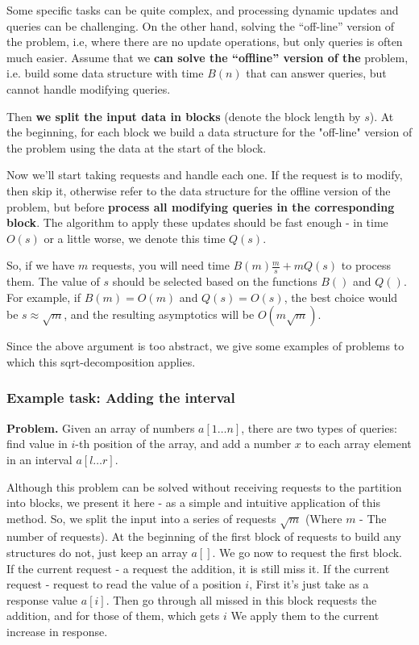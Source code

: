 Some specific tasks can be quite complex, and processing dynamic updates and queries can be challenging. On the other hand, solving the ``off-line'' version of the problem, i.e, where there are no update operations, but only queries is often much easier. Assume that we \textbf{can solve the ``offline'' version of the} problem, i.e. build some data structure with time $B(n)$ that can answer queries, but cannot handle modifying queries.

Then \textbf{we split the input data in blocks} (denote the block length by $s$). At the beginning, for each block we build a data structure for the "off-line" version of the problem using the data at the start of the block.

Now we'll start taking requests and handle each one. If the request is to modify, then skip it, otherwise refer to the data structure for the offline version of the problem, but before \textbf{process all modifying queries in the corresponding block}. The algorithm to apply these updates should be fast enough - in time $O (s)$ or a little worse, we denote this time $Q (s)$.

So, if we have $m$ requests, you will need time $B (m) \frac {m} {s} + m Q (s)$ to process them. The value of $s$ should be selected based on the functions $B()$ and $Q()$. For example, if $B (m) = O (m)$ and $Q (s) = O (s)$, the best choice would be $s \approx \sqrt {m}$, and the resulting asymptotics will be $O (m \sqrt {m})$.

Since the above argument is too abstract, we give some examples of problems to which this sqrt-decomposition applies.

\subsubsection{ Example task: Adding the interval }

\textbf{Problem. } Given an array of numbers $a [1 \ldots n]$, there are two types of queries: find value in $i$-th position of the array, and add a number $x$ to each array element in an interval $a [l \dots r]$.

Although this problem can be solved without receiving requests to the partition into blocks, we present it here - as a simple and intuitive application of this method.
So, we split the input into a series of requests $\sqrt {m}$ (Where $m$ - The number of requests). At the beginning of the first block of requests to build any structures do not, just keep an array $a []$. We go now to request the first block. If the current request - a request the addition, it is still miss it. If the current request - request to read the value of a position $i$, First it's just take as a response value $a [i]$. Then go through all missed in this block requests the addition, and for those of them, which gets $i$ We apply them to the current increase in response.

